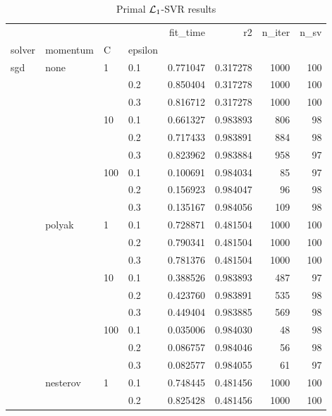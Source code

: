 \begin{table}[H]
\centering
\caption{Primal $\protect \mathcal{L}_1$-SVR results}
\label{primal_l1_svr_cv_results}
\begin{tabular}{llllrrrr}
\toprule
          &   &     &     &  fit\_time &        r2 &  n\_iter &  n\_sv \\
solver & momentum & C & epsilon &           &           &         &       \\
\midrule
sgd & none & 1   & 0.1 &  0.771047 &  0.317278 &    1000 &   100 \\
          &   &     & 0.2 &  0.850404 &  0.317278 &    1000 &   100 \\
          &   &     & 0.3 &  0.816712 &  0.317278 &    1000 &   100 \\
          &   & 10  & 0.1 &  0.661327 &  0.983893 &     806 &    98 \\
          &   &     & 0.2 &  0.717433 &  0.983891 &     884 &    98 \\
          &   &     & 0.3 &  0.823962 &  0.983884 &     958 &    97 \\
          &   & 100 & 0.1 &  0.100691 &  0.984034 &      85 &    97 \\
          &   &     & 0.2 &  0.156923 &  0.984047 &      96 &    98 \\
          &   &     & 0.3 &  0.135167 &  0.984056 &     109 &    98 \\
          & polyak & 1   & 0.1 &  0.728871 &  0.481504 &    1000 &   100 \\
          &   &     & 0.2 &  0.790341 &  0.481504 &    1000 &   100 \\
          &   &     & 0.3 &  0.781376 &  0.481504 &    1000 &   100 \\
          &   & 10  & 0.1 &  0.388526 &  0.983893 &     487 &    97 \\
          &   &     & 0.2 &  0.423760 &  0.983891 &     535 &    98 \\
          &   &     & 0.3 &  0.449404 &  0.983885 &     569 &    98 \\
          &   & 100 & 0.1 &  0.035006 &  0.984030 &      48 &    98 \\
          &   &     & 0.2 &  0.086757 &  0.984046 &      56 &    98 \\
          &   &     & 0.3 &  0.082577 &  0.984055 &      61 &    97 \\
          & nesterov & 1   & 0.1 &  0.748445 &  0.481456 &    1000 &   100 \\
          &   &     & 0.2 &  0.825428 &  0.481456 &    1000 &   100 \\

\end{tabular}
\end{table}
